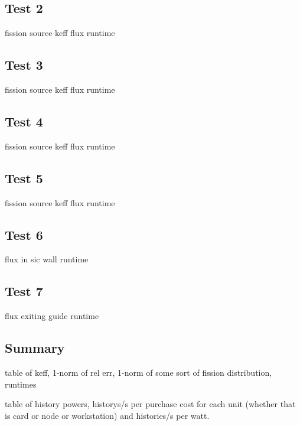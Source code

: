 \documentclass[preprint,12pt]{elsarticle}
\begin{document}
\subsection{Test 2}

fission source
keff
flux
runtime

\subsection{Test 3}

fission source
keff
flux
runtime

\subsection{Test 4}

fission source
keff
flux
runtime

\subsection{Test 5}

fission source
keff
flux
runtime

\subsection{Test 6}

flux in sic wall
runtime

\subsection{Test 7}

flux exiting guide
runtime

\subsection{Summary}

table of keff, 1-norm of rel err, 1-norm of some sort of fission distribution, runtimes

table of history powers, historys/s per purchase cost for each unit (whether that is card or node or workstation) and histories/s per watt. 
\end{document}
